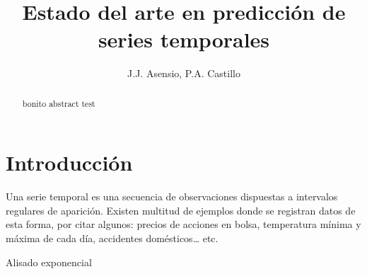 \documentclass{llncs}
\begin{document}

\title{Estado del arte en predicción de series temporales}


\author{J.J. Asensio, P.A. Castillo}

\maketitle
%
%
\begin{abstract} 
bonito abstract test
\end{abstract}


%
%
\section{Introducción}
\label{sec:intro}
Una serie temporal es una secuencia de observaciones dispuestas a intervalos regulares de aparición. Existen multitud de ejemplos donde se registran datos de esta forma, por citar algunos: precios de acciones en bolsa, temperatura mínima y máxima de cada día, accidentes domésticos… etc.

Alisado exponencial
\end{document}
